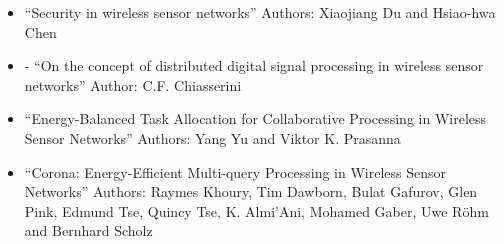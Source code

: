 \begin{itemize}
    \item “Security in wireless sensor networks” Authors: Xiaojiang Du and Hsiao-hwa Chen
    \item -	“On the concept of distributed digital signal processing in wireless sensor networks” Author: C.F. Chiasserini
    \item “Energy-Balanced Task Allocation for Collaborative Processing in Wireless Sensor Networks” Authors: Yang Yu and Viktor K. Prasanna 
    \item “Corona: Energy-Efficient Multi-query Processing in Wireless Sensor Networks” Authors: Raymes Khoury, Tim Dawborn, Bulat Gafurov, Glen Pink, Edmund Tse, Quincy Tse, K. Almi’Ani, Mohamed Gaber, Uwe Röhm and Bernhard Scholz
\end{itemize}

